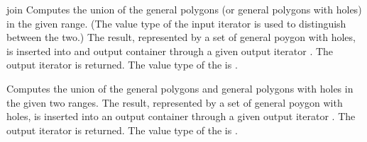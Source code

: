 \begin{ccRefFunction}{join}
{Computes the union of the general polygons (or general polygons with
holes) in the given range. (The value type of the input iterator is
used to distinguish between the two.) The result, represented by a set
of general poygon with holes, is inserted into and output container
through a given output iterator . The output iterator is
returned. The value type of the  is
.}

{Computes the union of the general polygons and general polygons
with holes in the given two ranges. The result, represented by a set
of general poygon with holes, is inserted into an output container
through a given output iterator . The output iterator is
returned. The value type of the  is
.}

\ccSeeAlso
{}\\
\\
\\

\end{ccRefFunction}
